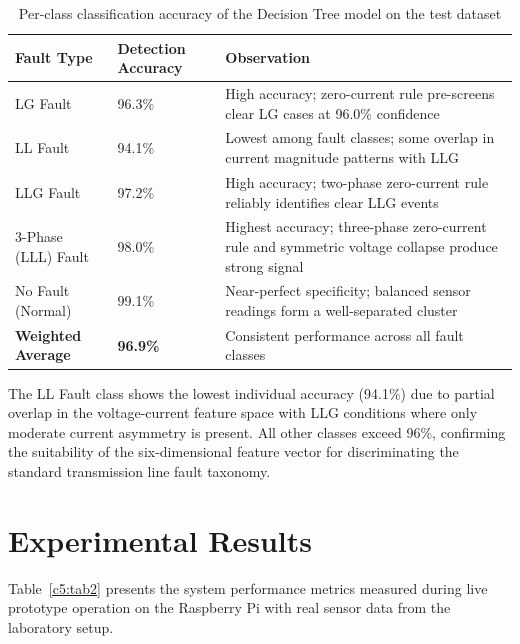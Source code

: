 \begin{table}[H]
\centering
\fontsize{10}{12}\selectfont
\begin{tabular}{|p{3.5cm}|p{2.8cm}|p{6cm}|}
\hline
\textbf{Fault Type} & \textbf{Detection Accuracy} & \textbf{Observation} \\
\hline
LG Fault & 96.3\% & High accuracy; zero-current rule pre-screens clear LG cases at 96.0\% confidence \\
\hline
LL Fault & 94.1\% & Lowest among fault classes; some overlap in current magnitude patterns with LLG \\
\hline
LLG Fault & 97.2\% & High accuracy; two-phase zero-current rule reliably identifies clear LLG events \\
\hline
3-Phase (LLL) Fault & 98.0\% & Highest accuracy; three-phase zero-current rule and symmetric voltage collapse produce strong signal \\
\hline
No Fault (Normal) & 99.1\% & Near-perfect specificity; balanced sensor readings form a well-separated cluster \\
\hline
\textbf{Weighted Average} & \textbf{96.9\%} & Consistent performance across all fault classes \\
\hline
\end{tabular}
\caption{Per-class classification accuracy of the Decision Tree model on the test dataset}
\label{c5:tab1}
\end{table}

The LL Fault class shows the lowest individual accuracy (94.1\%) due to partial overlap in the voltage-current feature space with LLG conditions where only moderate current asymmetry is present. All other classes exceed 96\%, confirming the suitability of the six-dimensional feature vector for discriminating the standard transmission line fault taxonomy.

\section{Experimental Results}

Table~\ref{c5:tab2} presents the system performance metrics measured during live prototype operation on the Raspberry Pi with real sensor data from the laboratory setup.

